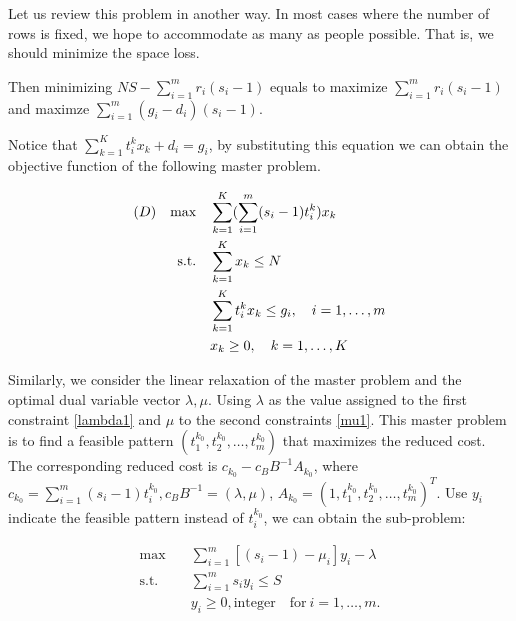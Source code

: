 Let us review this problem in another way. In most cases where the number of rows is fixed, we hope to accommodate as many as people possible. That is, we should minimize the space loss.

%
%

Then minimizing $NS - \sum_{i=1}^m r_i(s_i-1)$ equals to maximize $\sum_{i=1}^m r_i(s_i-1)$ and maximze $\sum_{i=1}^m (g_i - d_i)(s_i-1)$.

Notice that $\sum_{k=1}^K t_i^k x_k + d_i = g_i$, by substituting this equation we can obtain the objective function of the following master problem.

\begin{align}
(D) \quad \mbox{max}\quad & \sum_{k=1}^K(\sum_{i=1}^m (s_i-1)t_i^k) x_{k} \notag \\
\mbox{s.t.} \quad & \sum_{k=1}^K x_{k} \leq N \label{lambda1} \\
& \sum_{k=1}^K t_i^k x_k \leq g_i,\quad i=1,\ldots,m  \label{mu1} \\
& x_{k} \geq 0, \quad k = 1,\ldots,K \notag
\end{align}

Similarly, we consider the linear relaxation of the master problem and the optimal dual variable vector $\lambda,\mu$. Using $\lambda$ as the value assigned to the first constraint \eqref{lambda1} and $\mu$ to the second constraints \eqref{mu1}. This master problem is to find a feasible pattern $(t_1^{k_0},t_2^{k_0},\ldots, t_m^{k_0})$ that maximizes the reduced cost. The corresponding reduced cost is $c_{k_0} - c_B B^{-1}A_{k_0}$, where $c_{k_0} = \sum_{i=1}^m (s_i-1)t_i^{k_0}, c_B B^{-1} = (\lambda,\mu)$, $A_{k_0} = (1,t_1^{k_0},t_2^{k_0},\ldots,t_m^{k_0})^T$.
Use $y_i$ indicate the feasible pattern instead of $t_i^{k_0}$, we can obtain the sub-problem:

\[\begin{split}\mbox{max}\quad & \sum_{i=1}^m \left[(s_i-1) -\mu_i\right] y_{i} - \lambda \\
      \mbox{s.t.} \quad & \sum_{i=1}^m s_i y_i \leq S  \\
      & y_i \geq 0, \mbox{integer}\quad \mbox{for}~ i=1,\ldots,m.\\
\end{split}\]

